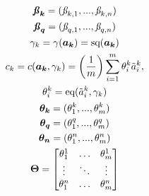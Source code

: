 \documentclass{article}
\begin{document}
\begin{gather}
    \boldsymbol{\textbf{\textit{\ss}}_{k}} = (\textit{\ss}_{k,1}, ..., \textit{\ss}_{k,n})\\
    \boldsymbol{\textbf{\textit{\ss}}_{q}} = (\textit{\ss}_{q,1}, ..., \textit{\ss}_{q,n})\\
    \gamma_{k} = 
    \gamma(\boldsymbol{a_k}) = 
        \text{sq}(\boldsymbol{a_k})\\
    c_{k} = 
    c(\boldsymbol{a_k}, \gamma_{k}) = 
        \left( \frac{1}{m} \right)
        \sum_{i=1}^{m}{
            \theta_{i}^{k}
            \tilde{a}_{i}^{k}
            },\\
    \theta_{i}^{k} = \text{eq}(\tilde{a}_{i}^{k}, \gamma_{k})\\
    \boldsymbol{\theta_{k}} = (\theta_{1}^{k}, ..., \theta_{m}^{k})\\
    \boldsymbol{\theta_{q}} = (\theta_{1}^{q}, ..., \theta_{m}^{q})\\
    \boldsymbol{\theta_{n}} = (\theta_{1}^{n}, ..., \theta_{m}^{n})\\
    \boldsymbol{\Theta} = 
    \begin{bmatrix}
        \theta_{1}^{1} & \hdots & \theta_{m}^{1}\\
        \vdots & \ddots & \vdots\\
        \theta_{1}^{n} & \hdots & \theta_{m}^{n}\\
    \end{bmatrix}
\end{gather}


















\end{document}
